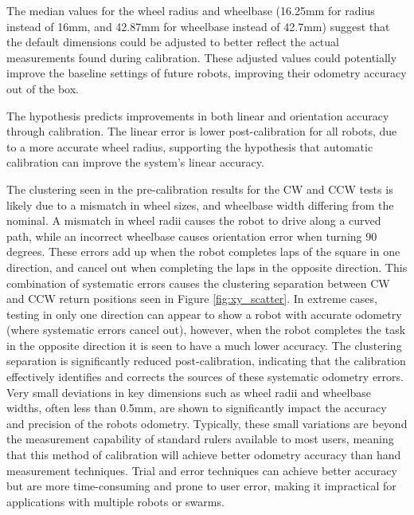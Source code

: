 \documentclass[conference]{IEEEtran}
\begin{document}
The median values for the wheel radius and wheelbase (16.25mm for radius instead of 16mm, and 42.87mm for wheelbase instead of 42.7mm) suggest that the default dimensions could be adjusted to better reflect the actual measurements found during calibration. 
These adjusted values could potentially improve the baseline settings of future robots, improving their odometry accuracy out of the box.

The hypothesis predicts improvements in both linear and orientation accuracy through calibration.
The linear error is lower post-calibration for all robots, due to a more accurate wheel radius, supporting the hypothesis that automatic calibration can improve the system's linear accuracy. 

The clustering seen in the pre-calibration results for the CW and CCW tests is likely due to a mismatch in wheel sizes, and wheelbase width differing from the nominal.
A mismatch in wheel radii causes the robot to drive along a curved path, while an incorrect wheelbase causes orientation error when turning 90 degrees.
These errors add up when the robot completes laps of the square in one direction, and cancel out when completing the laps in the opposite direction.
This combination of systematic errors causes the clustering separation between CW and CCW return positions seen in Figure \ref{fig:xy_scatter}.
In extreme cases, testing in only one direction can appear to show a robot with accurate odometry (where systematic errors cancel out), however, when the robot completes the task in the opposite direction it is seen to have a much lower accuracy.
The clustering separation is significantly reduced post-calibration, indicating that the calibration effectively identifies and corrects the sources of these systematic odometry errors. \\

Very small deviations in key dimensions such as wheel radii and wheelbase widths, often less than 0.5mm, are shown to significantly impact the accuracy and precision of the robots odometry. 
Typically, these small variations are beyond the measurement capability of standard rulers available to most users, meaning that this method of calibration will achieve better odometry accuracy than hand measurement techniques.
Trial and error techniques can achieve better accuracy but are more time-consuming and prone to user error, making it impractical for applications with multiple robots or swarms.
\end{document}
